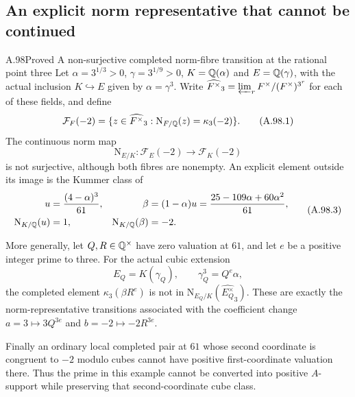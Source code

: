 \subsection{An explicit norm representative that cannot be continued}

\begin{statement}{A.98}{Proved}
{A non-surjective completed norm-fibre transition at the rational point three}
Let $\alpha=3^{1/3}>0$, $\gamma=3^{1/9}>0$,
$K=\mathbb Q(\alpha)$ and $E=\mathbb Q(\gamma)$, with the actual inclusion
$K\hookrightarrow E$ given by $\alpha=\gamma^3$.
Write $\widehat{F^\times}_3=\varprojlim_r F^\times/(F^\times)^{3^r}$
for each of these fields, and define
\[
 \mathcal F_F(-2)=
 \{z\in\widehat{F^\times}_3:\mathrm N_{F/\mathbb Q}(z)=\kappa_3(-2)\}.
 \tag{A.98.1}
\]
The continuous norm map
\[
 \mathrm N_{E/K}:\mathcal F_E(-2)\longrightarrow\mathcal F_K(-2)
 \tag{A.98.2}
\]
is not surjective, although both fibres are nonempty.  An explicit
element outside its image is the Kummer class of
\[
 \begin{aligned}
 u&=\frac{(4-\alpha)^3}{61},&
 \beta&=(1-\alpha)u
       =\frac{25-109\alpha+60\alpha^2}{61},\\
 \mathrm N_{K/\mathbb Q}(u)&=1,&
 \mathrm N_{K/\mathbb Q}(\beta)&=-2.
 \end{aligned}
 \tag{A.98.3}
\]

More generally, let $Q,R\in\mathbb Q^\times$ have zero valuation at
$61$, and let $e$ be a positive integer prime to three.
For the actual cubic extension
\[
 E_Q=K(\gamma_Q),\qquad \gamma_Q^3=Q^e\alpha,
 \tag{A.98.4}
\]
the completed element $\kappa_3(\beta R^e)$ is not in
$\mathrm N_{E_Q/K}(\widehat{E_Q^\times}_3)$.
These are exactly the norm-representative transitions associated
with the coefficient change $a=3\mapsto3Q^{3e}$ and
$b=-2\mapsto-2R^{3e}$.

Finally an ordinary local completed pair at $61$ whose second
coordinate is congruent to $-2$ modulo cubes cannot have positive
first-coordinate valuation there.  Thus the prime in this example
cannot be converted into positive $A$-support while preserving
that second-coordinate cube class.
\end{statement}
